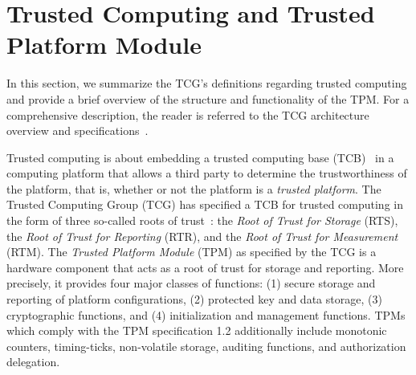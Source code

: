 \documentclass[runningheads]{llncs}
\begin{document}
\section{Trusted Computing and Trusted Platform Module}\label{sec:background}
In this section, we summarize the TCG's definitions regarding trusted computing and provide a brief
overview of the structure and functionality of the TPM. For a comprehensive description, the reader
is referred to the TCG architecture overview and specifications~\cite{TCGArch,TCGSpec}.

Trusted computing is about embedding a trusted computing base (TCB)~\cite{Bishop2003} in a computing
platform that allows a third party to determine the trustworthiness of the platform, that is,
whether or not the platform is a \emph{trusted platform}.
The Trusted
Computing Group (TCG) has specified a TCB for trusted computing in the form of three so-called roots
of trust~\cite{TCGArch}: the \emph{Root of Trust for Storage} (RTS), the \emph{Root of Trust for
Reporting} (RTR), and the \emph{Root of Trust for Measurement} (RTM). The \emph{Trusted Platform
Module} (TPM) as specified by the TCG is a hardware component that acts as a root of trust for
storage and reporting. More precisely, it provides four major classes of functions: (1) secure
storage and reporting of platform configurations, (2) protected key and data storage, (3)
cryptographic functions, and (4) initialization and management functions. TPMs which comply with
the TPM specification 1.2 additionally include monotonic counters, timing-ticks, non-volatile
storage, auditing functions, and authorization delegation.
\end{document}
